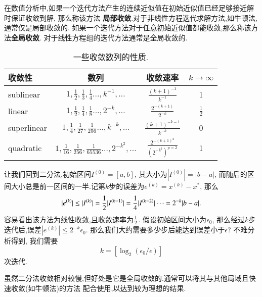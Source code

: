 在数值分析中,如果一个迭代方法产生的连续近似值在初始近似值已经足够接近解时保证收敛到解,
那么称该方法
\textbf{局部收敛}.对于非线性方程迭代求解方法,如牛顿法,通常仅是局部收敛的.
如果一个迭代方法对于任意初始近似值都能收敛,那么称该方法\textbf{全局收敛}.
对于线性方程组的迭代方法通常是全局收敛的.

\begin{table}[ht]
    \centering
    \caption{一些收敛数列的性质.}
    \label{tab:convergent_sequences}
\begin{tabular}{lccc}
    \hline 收敛性 & 数列 & 收敛速率 & $k \rightarrow \infty$ \\
    \hline sublinear & $1, \frac{1}{2}, \frac{1}{3}, \frac{1}{4} \ldots, k^{-1}, \ldots$ & $\frac{(k+1)^{-1}}{k^{-1}}$ & 1 \\
    linear & $1, \frac{1}{2}, \frac{1}{4}, \frac{1}{8} \ldots, 2^{-k}, \ldots$ & $\frac{2^{-(k+1)}}{2^{-k}}$ & $\frac{1}{2}$ \\
    superlinear & $1, \frac{1}{4}, \frac{1}{27}, \frac{1}{256} \ldots, k^{-k}, \ldots$ & $\frac{(k+1)^{-k-1}}{k^{-k}}$ & 0 \\
    quadratic & $1, \frac{1}{16}, \frac{1}{256}, \frac{1}{65536} \ldots, 2^{-k^2}, \ldots$ & $\frac{2^{-(k+1)^2}}{\left(2^{-k^2}\right)^{p=2}}$ & 1 \\
    \hline
\end{tabular}
\end{table}

让我们回到二分法,初始区间$I^{(0)} = [a,b]$, 其大小为$|I^{(0)}| = |b-a|$,
而随后的区间大小总是前一区间的一半.记第$k$步的误差为$e^{(k)} = x^{(k)} - x^*$,
那么
\begin{equation}
    |e^{(k)}| \leq |I^{(k)}| =  {\frac{1}{2}} |I^{(k-1)}| = \frac{1}{4} 
    |I^{(k-2)}| \cdots = 2^{-k} | b-a|.
\end{equation}
容易看出该方法为线性收敛,且收敛速率为${\frac{1}{2}}$. 假设初始区间大小为$\epsilon_0$,
那么经过$k$步迭代后,误差$|e^{(k)}| \leq 2^{-k} \epsilon_0$.
那么我们大约需要多少步后能达到误差小于$\epsilon$?
不难分析得到,
我们需要
$$
 k = [ \log_2 (\epsilon_0/\epsilon)]
$$
次迭代.

虽然二分法收敛相对较慢,但好处是它是全局收敛的.通常可以将其与其他局域且快速收敛(如牛顿法)的方法
配合使用,以达到较为理想的结果.

